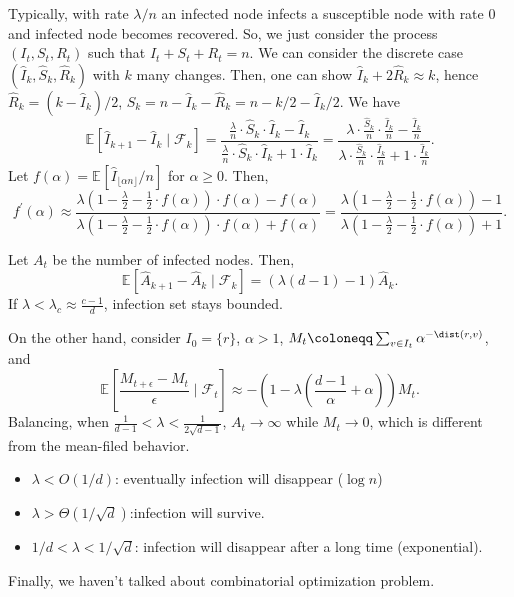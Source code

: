 Typically, with rate \(\lambda / n\) an infected node infects a susceptible node with rate \(0\) and infected node becomes recovered. So, we just consider the process \((I_t, S_t, R_t)\) such that \(I_t + S_t + R_t = n\). We can consider the discrete case \((\hat{I} _k, \hat{S} _k, \hat{R} _k)\) with \(k\) many changes. Then, one can show \(\hat{I} _k + 2 \hat{R} _k \approx k\), hence \(\hat{R} _k = (k - \hat{I} _k) / 2\), \(\hat{S} _k = n - \hat{I} _k - \hat{R} _k = n - k / 2 - \hat{I} _k / 2\). We have
\[
	\mathbb{E}_{}[\hat{I} _{k+1} - \hat{I} _k \mid \mathcal{F} _k]
	= \frac{\frac{\lambda }{n} \cdot \hat{S} _k \cdot \hat{I} _k - \hat{I} _k}{\frac{\lambda }{n} \cdot \hat{S} _k \cdot \hat{I} _k + 1 \cdot \hat{I} _k}
	= \frac{\lambda \cdot \frac{\hat{S} _k}{n} \cdot \frac{\hat{I} _k}{n} - \frac{\hat{I} _k}{n}}{\lambda \cdot \frac{\hat{S} _k}{n} \cdot \frac{\hat{I} _k}{n} + 1 \cdot \frac{\hat{I} _k}{n}}.
\]
Let \(f(\alpha ) = \mathbb{E}_{}[\hat{I} _{\lfloor \alpha n \rfloor } / n] \) for \(\alpha \geq 0\). Then,
\[
	f^{\prime} (\alpha )
	\approx \frac{\lambda (1 - \frac{\lambda }{2} - \frac{1}{2} \cdot f(\alpha )) \cdot f(\alpha ) - f(\alpha )}{\lambda (1 - \frac{\lambda }{2} - \frac{1}{2} \cdot f(\alpha )) \cdot f(\alpha ) + f(\alpha )}
	= \frac{\lambda (1 - \frac{\lambda }{2} - \frac{1}{2} \cdot f(\alpha )) - 1}{\lambda (1 - \frac{\lambda }{2} - \frac{1}{2} \cdot f(\alpha )) + 1}.
\]

\begin{eg}
	Let \(A_t\) be the number of infected nodes. Then,
	\[
		\mathbb{E}_{}[\hat{A} _{k+1} - \hat{A} _k \mid \mathcal{F} _k]
		= (\lambda (d-1) - 1) \hat{A} _k .
	\]
	If \(\lambda < \lambda _c \approx \frac{c-1}{d}\), infection set stays bounded.

	On the other hand, consider \(I_0 = \{ r \} \), \(\alpha > 1\), \(M_t \coloneqq \sum_{v \in I_t} \alpha ^{- \dist(r, v)}\), and
	\[
		\mathbb{E}_{}\left[\frac{M_{t + \epsilon } - M_t}{\epsilon } \mid \mathcal{F} _t\right]
		\approx - \left( 1 - \lambda \left( \frac{d-1}{\alpha } + \alpha  \right)  \right) M_t.
	\]
	Balancing, when \(\frac{1}{d-1} < \lambda < \frac{1}{2 \sqrt{d - 1} }\), \(A_t \to \infty \) while \(M_t \to 0\), which is different from the mean-filed behavior.
	\begin{itemize}
		\item \(\lambda < O(1 / d)\): eventually infection will disappear (\(\log n\))
		\item \(\lambda > \Theta (1 / \sqrt{d} )\):infection will survive.
		\item \(1 / d < \lambda < 1 / \sqrt{d} \): infection will disappear after a long time (exponential).
	\end{itemize}
\end{eg}

Finally, we haven't talked about combinatorial optimization problem.